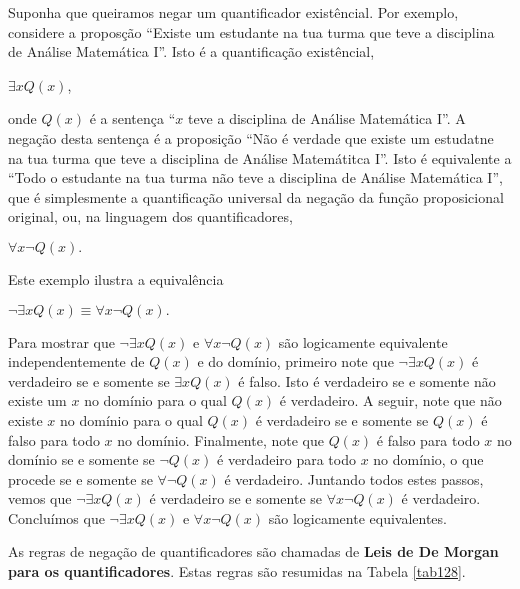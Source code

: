 Suponha que queiramos negar um quantificador existêncial. Por exemplo,
considere a proposção ``Existe um estudante na tua turma que teve a disciplina
de Análise Matemática I''. Isto é a quantificação existêncial,

\begin{center}
$\exists xQ(x)$,
\end{center}

onde $Q(x)$ é a sentença ``$x$ teve a disciplina de Análise Matemática I''. A
negação desta sentença é a proposição ``Não é verdade que existe um estudatne na
tua turma que teve a disciplina de Análise Matemátitca I''. Isto é equivalente a
``Todo o estudante na tua turma não teve a disciplina de Análise Matemática I'',
que é simplesmente a quantificação universal da negação da função proposicional
original, ou, na linguagem dos quantificadores,

\begin{center}
$\forall x\lnot Q(x).$
\end{center}

Este exemplo ilustra a equivalência

\begin{center}
\colorbox{blue!10}{$\lnot \exists xQ(x) \equiv \forall x\lnot Q(x).$}
\end{center}


Para mostrar que $\lnot\exists xQ(x)$ e $\forall x\lnot Q(x)$ são logicamente
equivalente independentemente de $Q(x)$ e do domínio, primeiro note que
$\lnot\exists xQ(x)$ é verdadeiro se e somente se $\exists xQ(x)$ é falso. Isto
é verdadeiro se e somente não existe um $x$ no domínio para o qual $Q(x)$ é
verdadeiro. A seguir, note que não existe $x$ no domínio para o qual $Q(x)$ é
verdadeiro se e somente se $Q(x)$ é falso para todo $x$ no domínio. Finalmente,
note que $Q(x)$ é falso para todo $x$ no domínio se e somente se $\lnot Q(x)$ é
verdadeiro para todo $x$ no domínio, o que procede se e somente se
$\forall\lnot Q(x)$ é verdadeiro. Juntando todos estes passos, vemos que
$\lnot\exists xQ(x)$ é verdadeiro se e somente se $\forall x\lnot Q(x)$ é
verdadeiro. Concluímos que $\lnot\exists xQ(x)$ e $\forall x\lnot Q(x)$ são
logicamente equivalentes.


As regras de negação de quantificadores são chamadas de \textbf{Leis de De
Morgan para os quantificadores}. Estas regras são resumidas na Tabela
\ref{tab128}.


